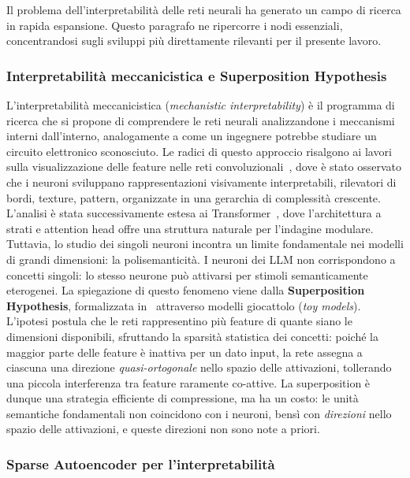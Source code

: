 Il problema dell'interpretabilità delle reti neurali ha generato un campo di ricerca in rapida espansione. Questo paragrafo ne ripercorre i nodi essenziali, concentrandosi sugli sviluppi più direttamente rilevanti per il presente lavoro.
\subsubsection{Interpretabilità meccanicistica e Superposition Hypothesis}
\label{subsubsec:01_mech_interp}
L'interpretabilità meccanicistica (\textit{mechanistic interpretability}) è il programma di ricerca che si propone di comprendere le reti neurali analizzandone i meccanismi interni dall'interno, analogamente a come un ingegnere potrebbe studiare un circuito elettronico sconosciuto. Le radici di questo approccio risalgono ai lavori sulla visualizzazione delle feature nelle reti convoluzionali~\parencite{olah2017feature}, dove è stato osservato che i neuroni sviluppano rappresentazioni visivamente interpretabili, rilevatori di bordi, texture, pattern, organizzate in una gerarchia di complessità crescente. L'analisi è stata successivamente estesa ai Transformer~\parencite{elhage2021mathematical, olsson2022context}, dove l'architettura a strati e attention head offre una struttura naturale per l'indagine modulare.
Tuttavia, lo studio dei singoli neuroni incontra un limite fondamentale nei modelli di grandi dimensioni: la polisemanticità. I neuroni dei LLM non corrispondono a concetti singoli: lo stesso neurone può attivarsi per stimoli semanticamente eterogenei.
La spiegazione di questo fenomeno viene dalla \textbf{Superposition Hypothesis}, formalizzata in~\parencite{elhage2022toy} attraverso modelli giocattolo (\textit{toy models}). L'ipotesi postula che le reti rappresentino più feature di quante siano le dimensioni disponibili, sfruttando la sparsità statistica dei concetti: poiché la maggior parte delle feature è inattiva per un dato input, la rete assegna a ciascuna una direzione \textit{quasi-ortogonale} nello spazio delle attivazioni, tollerando una piccola interferenza tra feature raramente co-attive. La superposition è dunque una strategia efficiente di compressione, ma ha un costo: le unità semantiche fondamentali non coincidono con i neuroni, bensì con \textit{direzioni} nello spazio delle attivazioni, e queste direzioni non sono note a priori.
\subsubsection{Sparse Autoencoder per l'interpretabilità}
\label{subsubsec:01_sae_interp}

